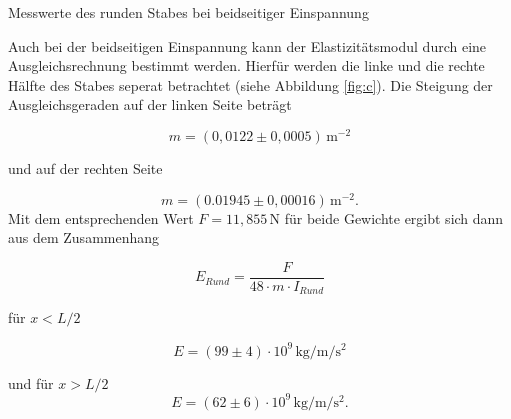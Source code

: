 \begin{table}[H]
  \centering
  
  
  \caption{Messwerte des runden Stabes bei beidseitiger Einspannung}
  \label{tab:e}
\end{table}
Auch bei der beidseitigen Einspannung kann der Elastizitätsmodul
durch eine Ausgleichsrechnung bestimmt werden. Hierfür werden
die linke und die rechte Hälfte des Stabes seperat betrachtet
(siehe Abbildung \ref{fig:c}). Die Steigung der Ausgleichsgeraden auf der linken Seite beträgt

\begin{equation*}
  m=(0,0122 \pm 0,0005)\,\si{\meter\tothe{-2}}
\end{equation*}

\noindent und auf der rechten Seite

\begin{equation*}
  m=(0.01945 \pm 0,00016)\,\si{\meter\tothe{-2}}.
\end{equation*}
\noindent Mit dem entsprechenden Wert $F=11,855 \, \si{\newton}$
für beide Gewichte ergibt sich dann aus dem Zusammenhang

\begin{equation}
  E_{Rund}=\frac{F}{48 \cdot m \cdot I_{Rund}}
\end{equation}

\noindent für $x<L/2$

\begin{equation*}
  E=(99 \pm 4) \cdot 10^9 \,\si{\kilo\gram\per\meter\per\second\squared}
\end{equation*}


\noindent und für $x>L/2$
\begin{equation*}
  E=(62 \pm 6) \cdot 10^9 \,\si{\kilo\gram\per\meter\per\second\squared}.
\end{equation*}

